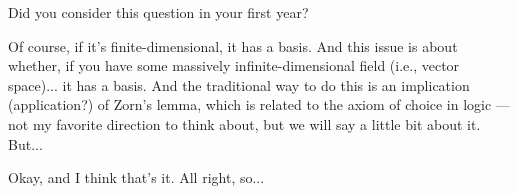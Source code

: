\begin{speech}[00:43:29 - 00:44:01]
Did you consider this question in your first year?

Of course, if it's finite-dimensional, it has a basis. And this issue is about whether, if you have some massively infinite-dimensional field (i.e., vector space)... it has a basis. And the traditional way to do this is an implication (application?) of Zorn's lemma, which is related to the axiom of choice in logic --- not my favorite direction to think about, but we will say a little bit about it. But...

Okay, and I think that's it. All right, so... 
\end{speech}

